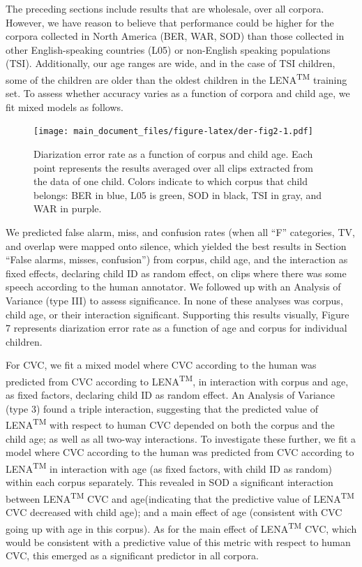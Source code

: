 \documentclass[english,floatsintext,man]{apa6}
\begin{document}
The preceding sections include results that are wholesale, over all
corpora. However, we have reason to believe that performance could be
higher for the corpora collected in North America (BER, WAR, SOD) than
those collected in other English-speaking countries (L05) or non-English
speaking populations (TSI). Additionally, our age ranges are wide, and
in the case of TSI children, some of the children are older than the
oldest children in the LENA\textsuperscript{TM} training set. To assess
whether accuracy varies as a function of corpora and child age, we fit
mixed models as follows.

\begin{figure}
\centering
\texttt{[image: main\_document\_files/figure-latex/der-fig2-1.pdf]}
\caption{\label{fig:der-fig2}Diarization error rate as a function of corpus
and child age. Each point represents the results averaged over all clips
extracted from the data of one child. Colors indicate to which corpus
that child belongs: BER in blue, L05 is green, SOD in black, TSI in
gray, and WAR in purple.}
\end{figure}

We predicted false alarm, miss, and confusion rates (when all
\enquote{F} categories, TV, and overlap were mapped onto silence, which
yielded the best results in Section \enquote{False alarms, misses,
confusion}) from corpus, child age, and the interaction as fixed
effects, declaring child ID as random effect, on clips where there was
some speech according to the human annotator. We followed up with an
Analysis of Variance (type III) to assess significance. In none of these
analyses was corpus, child age, or their interaction significant.
Supporting this results visually, Figure 7 represents diarization error
rate as a function of age and corpus for individual children.

For CVC, we fit a mixed model where CVC according to the human was
predicted from CVC according to LENA\textsuperscript{TM}, in interaction
with corpus and age, as fixed factors, declaring child ID as random
effect. An Analysis of Variance (type 3) found a triple interaction,
suggesting that the predicted value of LENA\textsuperscript{TM} with
respect to human CVC depended on both the corpus and the child age; as
well as all two-way interactions. To investigate these further, we fit a
model where CVC according to the human was predicted from CVC according
to LENA\textsuperscript{TM} in interaction with age (as fixed factors,
with child ID as random) within each corpus separately. This revealed in
SOD a significant interaction between LENA\textsuperscript{TM} CVC and
age(indicating that the predictive value of LENA\textsuperscript{TM} CVC
decreased with child age); and a main effect of age (consistent with CVC
going up with age in this corpus). As for the main effect of
LENA\textsuperscript{TM} CVC, which would be consistent with a
predictive value of this metric with respect to human CVC, this emerged
as a significant predictor in all corpora.
\end{document}
